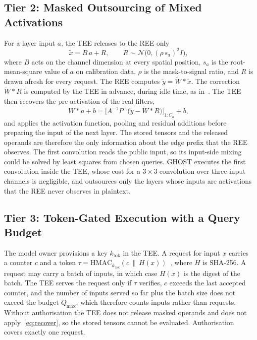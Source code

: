 \documentclass[lettersize,journal]{IEEEtran}
\begin{document}
\subsection{Tier 2: Masked Outsourcing of Mixed Activations}
For a layer input $a$, the TEE releases to the REE only
\begin{equation}
\tilde x = B\,a + R,\qquad R\sim\mathcal{N}\!\big(0,(\rho\,s_a)^2 I\big),
\label{eq:xtilde}
\end{equation}
where $B$ acts on the channel dimension at every spatial position, $s_a$ is the root-mean-square value of $a$ on calibration data, $\rho$ is the mask-to-signal ratio, and $R$ is drawn afresh for every request. The REE computes $\tilde y=\tilde W*\tilde x$. The correction $\tilde W*R$ is computed by the TEE in advance, during idle time, as in~\cite{tramer2018slalom,sun2023shadownet}. The TEE then recovers the pre-activation of the real filters,
\begin{equation}
W*a+b=\Big[A^{-1}P^{\top}\big(\tilde y-\tilde W*R\big)\Big]_{1:C_o}+b,
\label{eq:recover}
\end{equation}
and applies the activation function, pooling and residual additions before preparing the input of the next layer. The stored tensors and the released operands are therefore the only information about the edge prefix that the REE observes. The first convolution reads the public input, so its input-side mixing could be solved by least squares from chosen queries. GHOST executes the first convolution inside the TEE, whose cost for a $3\times3$ convolution over three input channels is negligible, and outsources only the layers whose inputs are activations that the REE never observes in plaintext.

\subsection{Tier 3: Token-Gated Execution with a Query Budget}
The model owner provisions a key $k_{\mathrm{tok}}$ in the TEE. A request for input $x$ carries a counter $c$ and a token $\tau=\mathrm{HMAC}_{k_{\mathrm{tok}}}(c\,\|\,H(x))$~\cite{krawczyk1997hmac}, where $H$ is SHA-256. A request may carry a batch of inputs, in which case $H(x)$ is the digest of the batch. The TEE serves the request only if $\tau$ verifies, $c$ exceeds the last accepted counter, and the number of inputs served so far plus the batch size does not exceed the budget $Q_{\max}$, which therefore counts inputs rather than requests. Without authorisation the TEE does not release masked operands and does not apply~\eqref{eq:recover}, so the stored tensors cannot be evaluated. Authorisation covers exactly one request.
\end{document}
